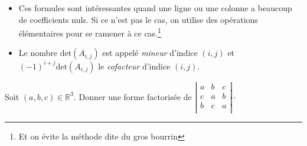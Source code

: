 \documentclass[a4paper,10pt]{report}
\begin{document}
\begin{Remarques}{}
\begin{itemize} 
\item Ces formules sont intéressantes quand une ligne ou une colonne a beaucoup de coefficients nuls. Si ce n'est pas le cas, on utilise des opérations élémentaires pour se ramener à ce cas.\footnote{Et on évite la méthode dite \og du gros bourrin \fg }
\item Le nombre $\textrm{det}(A_{i,j})$ est appelé \emph{mineur} d'indice $(i,j)$ et $(-1)^{i+j}\textrm{det}(A_{i,j})$ le \emph{cofacteur} d'indice $(i,j)$.
\end{itemize}
\end{Remarques}{}


\begin{Exemple} Soit $(a,b,c) \in \mathbb{R}^3$. Donner une forme factorisée de $\left\vert \begin{array}{ccc}
a & b & c \\
c & a & b \\
b & c & a \\
\end{array} \right\vert \cdot$
%
%

\end{Exemple}
\end{document}
